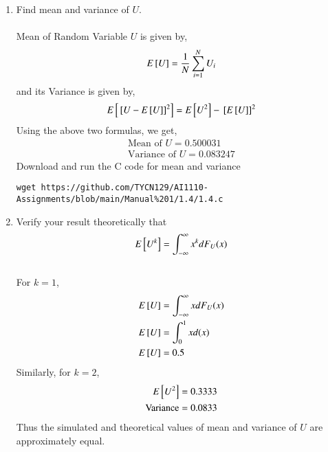 \documentclass[journal,12pt,twocolumn]{IEEEtran}
\renewcommand\thesection{\arabic{section}}
\begin{document}
\begin{enumerate}[label=\thesection.\arabic*
,ref=\thesection.\theenumi]
\item Find mean and variance of $U$.\\
\solution\\
Mean of Random Variable $U$ is given by,
\begin{equation}
E{}\left[U\right] = \frac{1}{N}\sum_{i=1}^{N}U_i
\end{equation}
and its Variance is given by,
\begin{equation}
E{}\left[{}\left[U - E{}\left[U\right]\right]^2\right] = E{}\left[U^2\right] - {}\left[E{}\left[U\right]\right]^2
\end{equation}
Using the above two formulas, we get,\\
\begin{align}
\text{Mean of } U = 0.500031\\
\text{Variance of } U = 0.083247
\end{align}
Download and run the C code for mean and variance
\begin{lstlisting}
wget https://github.com/TYCN129/AI1110-Assignments/blob/main/Manual%201/1.4/1.4.c
\end{lstlisting}
\item Verify your result theoretically that
\begin{equation}
E{}\left[U^k\right] = \int_{-\infty}^{\infty}x^kdF_{U}(x)
\end{equation}
\solution\\
For $k = 1$,
\begin{align}
E{}\left[U\right] &= \int_{-\infty}^{\infty}xdF_{U}(x)\\
E{}\left[U\right] &= \int_{0}^{1}xd(x)\\
E{}\left[U\right] &= 0.5
\end{align}
Similarly, for $k = 2$,
\begin{align}
E{}\left[U^2\right] &= 0.3333\\
\text{Variance} &= 0.0833
\end{align}
Thus the simulated and theoretical values of mean and variance of $U$ are approximately equal.
\end{enumerate}
\end{document}
